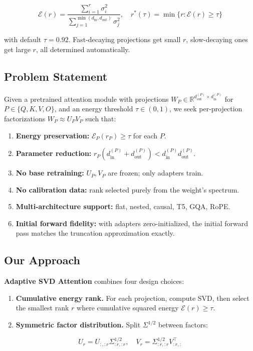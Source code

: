 \[
\mathcal{E}(r) = \frac{\sum_{i=1}^{r} \sigma_i^2}{\sum_{j=1}^{\min(d_\text{in}, d_\text{out})} \sigma_j^2}, \quad
r^*(\tau) = \min\{r : \mathcal{E}(r) \geq \tau\}
\tag{1.1}
\]

with default $\tau = 0.92$. Fast-decaying projections get 
small $r$, slow-decaying ones get large $r$, all determined automatically.

\subsection{Problem Statement}

Given a pretrained attention module with projections 
$W_P \in \mathbb{R}^{d_\text{out}^{(P)} \times d_\text{in}^{(P)}}$ for 
$P \in \{Q, K, V, O\}$, and an energy threshold $\tau \in (0, 1)$, we seek 
per-projection factorizations $W_P \approx U_P V_P$ such that:

\begin{enumerate}
\item \textbf{Energy preservation:} $\mathcal{E}_P(r_P) \geq \tau$ for each $P$.
\item \textbf{Parameter reduction:} $r_P (d_\text{in}^{(P)} + d_\text{out}^{(P)}) < d_\text{in}^{(P)} d_\text{out}^{(P)}$.
\item \textbf{No base retraining:} $U_P, V_P$ are frozen; only adapters train.
\item \textbf{No calibration data:} rank selected purely from the weight's spectrum.
\item \textbf{Multi-architecture support:} flat, nested, causal, T5, GQA, RoPE.
\item \textbf{Initial forward fidelity:} with adapters zero-initialized, the initial
  forward pass matches the truncation approximation exactly.

\end{enumerate}
\subsection{Our Approach}

\textbf{Adaptive SVD Attention} combines four design choices:

\begin{enumerate}
\item \textbf{Cumulative energy rank.} For each projection, compute SVD, then select
  the smallest rank $r$ where cumulative squared energy $\mathcal{E}(r) \geq \tau$.

\item \textbf{Symmetric factor distribution.} Split $\Sigma^{1/2}$ between factors:

\end{enumerate}
\[
U_r = U_{:, :r} \Sigma_{:r, :r}^{1/2}, \quad
V_r = \Sigma_{:r, :r}^{1/2} V_{:r, :}^\top
\tag{1.2}
\]

